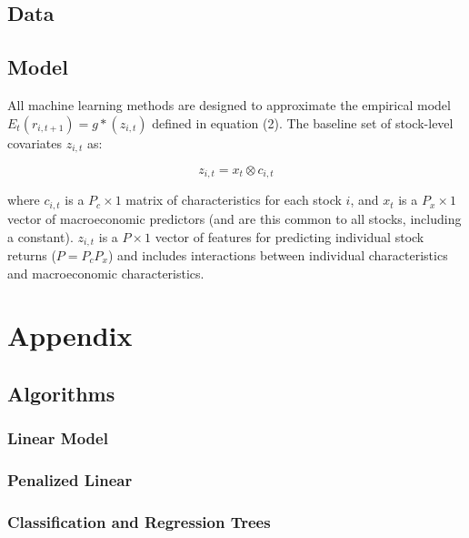 \documentclass[man, a4paper, biblatex]{article}
\newcommand{\smalltodo}[2][] {\todo[caption={#2}, size=\scriptsize,%
	fancyline,#1]{\begin{spacing}{.5}#2\end{spacing}}}
\newcommand{\rhs}[2][]{\smalltodo[color=green!30,#1]{{\bf RS:} #2}}
\begin{document}
\subsection{Data}

\rhs{Pending}

\subsection{Model}

All machine learning methods are designed to approximate the empirical model \( E_t(r_{i, t+1}) = g*(z_{i,t}) \) defined in equation (2). The baseline set of stock-level covariates \( z_{i,t} \) as:

\begin{equation}
	z_{i,t} = x_t \otimes c_{i,t}
\end{equation}

where \( c_{i,t} \) is a \( P_c \times 1 \) matrix of characteristics for each stock \(i\), and \(x_t\) is a $P_x \times 1$ vector of macroeconomic predictors (and are this common to all stocks, including a constant). $z_{i,t}$ is a $P \times 1$ vector of features for predicting individual stock returns ($P = P_cP_x$) and includes interactions between individual characteristics and macroeconomic characteristics. 

\section{Appendix}

\subsection{Algorithms}

\subsubsection{Linear Model}

\subsubsection{Penalized Linear}

\subsubsection{Classification and Regression Trees}
\end{document}
